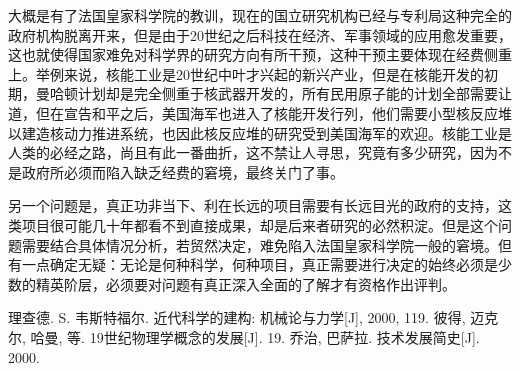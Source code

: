 \documentclass{article}
\begin{document}
大概是有了法国皇家科学院的教训，现在的国立研究机构已经与专利局这种完全的政府机构脱离开来，但是由于20世纪之后科技在经济、军事领域的应用愈发重要，这也就使得国家难免对科学界的研究方向有所干预，这种干预主要体现在经费侧重上。举例来说，核能工业是20世纪中叶才兴起的新兴产业，但是在核能开发的初期，曼哈顿计划却是完全侧重于核武器开发的，所有民用原子能的计划全部需要让道\cite{3}，但在宣告和平之后，美国海军也进入了核能开发行列，他们需要小型核反应堆以建造核动力推进系统，也因此核反应堆的研究受到美国海军的欢迎。核能工业是人类的必经之路，尚且有此一番曲折，这不禁让人寻思，究竟有多少研究，因为不是政府所必须而陷入缺乏经费的窘境，最终关门了事。

另一个问题是，真正功非当下、利在长远的项目需要有长远目光的政府的支持，这类项目很可能几十年都看不到直接成果，却是后来者研究的必然积淀。但是这个问题需要结合具体情况分析，若贸然决定，难免陷入法国皇家科学院一般的窘境。但有一点确定无疑：无论是何种科学，何种项目，真正需要进行决定的始终必须是少数的精英阶层，必须要对问题有真正深入全面的了解才有资格作出评判。

\begin{thebibliography}{}
理查德. S. 韦斯特福尔. 近代科学的建构: 机械论与力学[J], 2000, 119.
彼得, 迈克尔, 哈曼, 等. 19世纪物理学概念的发展[J]. 19.
乔治, 巴萨拉. 技术发展简史[J]. 2000.
\end{thebibliography}
\end{document}
